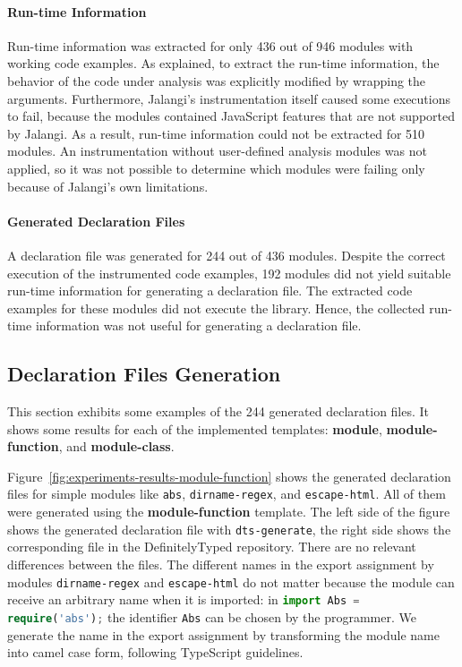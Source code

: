 \documentclass[english,cleveref,autoref,submission]{programming}
\newcommand{\figref}[1]{Figure~\ref{#1}}
\begin{document}
\paragraph*{Run-time Information}
Run-time information was extracted for only 436 out of 946 modules with working code
examples. As explained, to extract the run-time information, the behavior of the code
under analysis was explicitly modified by wrapping the arguments. Furthermore, Jalangi’s
instrumentation itself caused some executions to fail, because the modules contained
JavaScript features that are not supported by Jalangi. As a result, run-time information
could not be extracted for 510 modules. An instrumentation without user-defined analysis
modules was not applied, so it was not possible to determine which modules were failing
only because of Jalangi’s own limitations. 

\paragraph*{Generated Declaration Files}
A declaration file was generated for 244 out of 436 modules. Despite the correct execution
of the instrumented code examples, 192 modules did not yield suitable run-time information
for generating a declaration file. The extracted code examples for these modules did not
execute the library. Hence, the collected run-time information was not useful
for generating a declaration file. 

\subsection{Declaration Files Generation}
\label{sec:experiments-declaration-files-generation}


This section exhibits some examples of the 244 generated
declaration files. It shows some results for each of the implemented
templates: \textbf{module}, \textbf{module-function}, and
\textbf{module-class}. 

\figref{fig:experiments-results-module-function} shows the generated
declaration files for simple modules like \texttt{abs},
\texttt{dirname-regex}, and \texttt{escape-html}. All of them were
generated using the \textbf{module-function} template. The left side of the figure shows
the generated declaration file with 
\lstinline{dts-generate}, the right side shows the corresponding file
in the DefinitelyTyped repository. 
There are no relevant differences between the files. 
The different names in the export assignment by modules \texttt{dirname-regex} and
\texttt{escape-html} do not matter because the module can receive an arbitrary 
name when it is imported: in
\lstinline[language=TypeScript]/import Abs = require('abs');/ the
identifier \lstinline[language=TypeScript]/Abs/ can be chosen by the
programmer. We generate the name in the export 
assignment by transforming the module name into camel case form, following TypeScript
guidelines.
\end{document}
